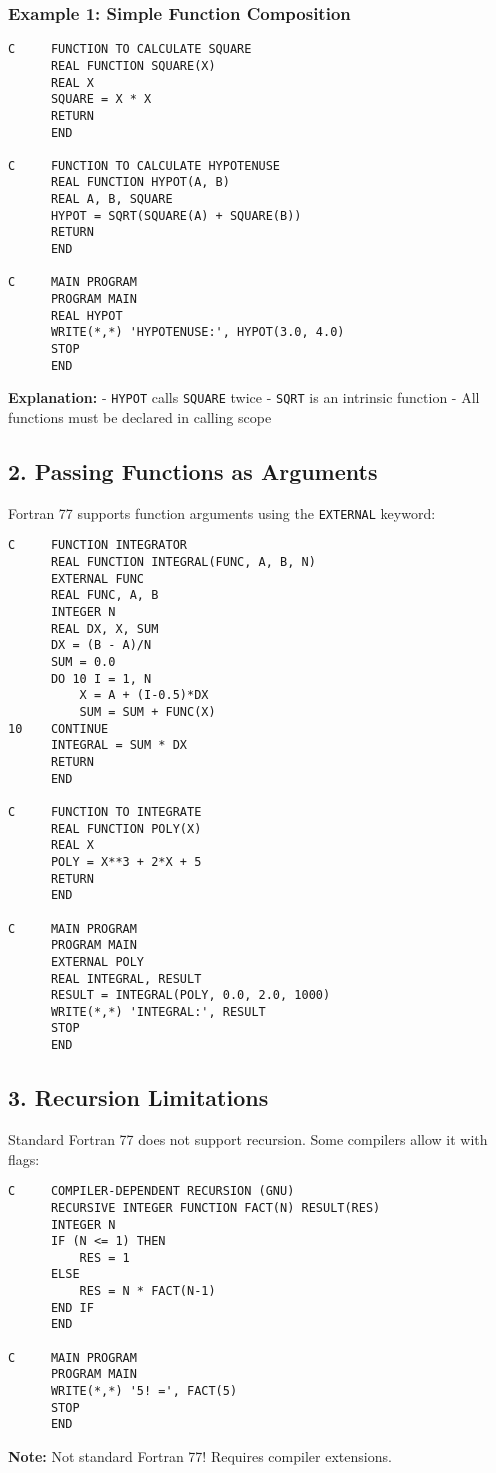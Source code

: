 \documentclass{book}
\begin{document}
\subsubsection*{Example 1: Simple Function Composition}
\begin{verbatim}
C     FUNCTION TO CALCULATE SQUARE
      REAL FUNCTION SQUARE(X)
      REAL X
      SQUARE = X * X
      RETURN
      END

C     FUNCTION TO CALCULATE HYPOTENUSE
      REAL FUNCTION HYPOT(A, B)
      REAL A, B, SQUARE
      HYPOT = SQRT(SQUARE(A) + SQUARE(B))
      RETURN
      END

C     MAIN PROGRAM
      PROGRAM MAIN
      REAL HYPOT
      WRITE(*,*) 'HYPOTENUSE:', HYPOT(3.0, 4.0)
      STOP
      END
\end{verbatim}
\textbf{Explanation:}
- \texttt{HYPOT} calls \texttt{SQUARE} twice
- \texttt{SQRT} is an intrinsic function
- All functions must be declared in calling scope

\subsection*{2. Passing Functions as Arguments}
Fortran 77 supports function arguments using the \texttt{EXTERNAL} keyword:
\begin{verbatim}
C     FUNCTION INTEGRATOR
      REAL FUNCTION INTEGRAL(FUNC, A, B, N)
      EXTERNAL FUNC
      REAL FUNC, A, B
      INTEGER N
      REAL DX, X, SUM
      DX = (B - A)/N
      SUM = 0.0
      DO 10 I = 1, N
          X = A + (I-0.5)*DX
          SUM = SUM + FUNC(X)
10    CONTINUE
      INTEGRAL = SUM * DX
      RETURN
      END

C     FUNCTION TO INTEGRATE
      REAL FUNCTION POLY(X)
      REAL X
      POLY = X**3 + 2*X + 5
      RETURN
      END

C     MAIN PROGRAM
      PROGRAM MAIN
      EXTERNAL POLY
      REAL INTEGRAL, RESULT
      RESULT = INTEGRAL(POLY, 0.0, 2.0, 1000)
      WRITE(*,*) 'INTEGRAL:', RESULT
      STOP
      END
\end{verbatim}

\subsection*{3. Recursion Limitations}
Standard Fortran 77 does not support recursion. Some compilers allow it with flags:
\begin{verbatim}
C     COMPILER-DEPENDENT RECURSION (GNU)
      RECURSIVE INTEGER FUNCTION FACT(N) RESULT(RES)
      INTEGER N
      IF (N <= 1) THEN
          RES = 1
      ELSE
          RES = N * FACT(N-1)
      END IF
      END

C     MAIN PROGRAM
      PROGRAM MAIN
      WRITE(*,*) '5! =', FACT(5)
      STOP
      END
\end{verbatim}
\textbf{Note:} Not standard Fortran 77! Requires compiler extensions.
\end{document}
